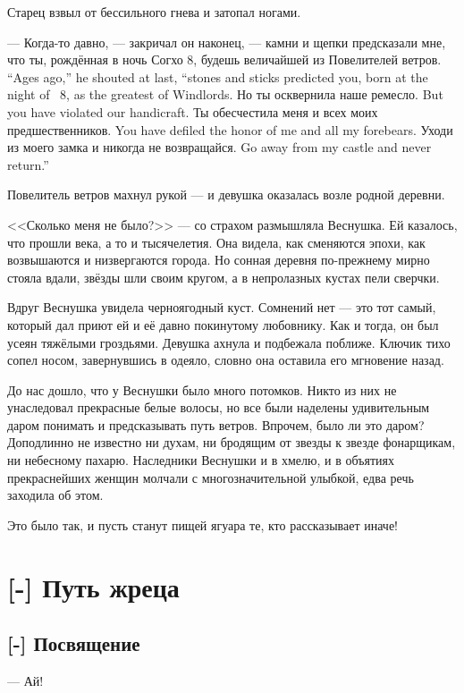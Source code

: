 Старец взвыл от бессильного гнева и затопал ногами.

{--- Когда-то давно, --- закричал он наконец, --- камни и щепки предсказали мне, что ты, рождённая в ночь Согхо 8, будешь величайшей из Повелителей ветров.}
{``Ages ago,'' he shouted at last, ``stones and sticks predicted you, born at the night of \Sogcho\ 8, as the greatest of Windlords.}
{Но ты осквернила наше ремесло.}
{But you have violated our handicraft.}
{Ты обесчестила меня и всех моих предшественников.}
{You have defiled the honor of me and all my forebears.}
{Уходи из моего замка и никогда не возвращайся.}
{Go away from my castle and never return.''}

Повелитель ветров махнул рукой --- и девушка оказалась возле родной деревни.

<<Сколько меня не было?>> --- со страхом размышляла Веснушка.
Ей казалось, что прошли века, а то и тысячелетия.
Она видела, как сменяются эпохи, как возвышаются и низвергаются города.
Но сонная деревня по-прежнему мирно стояла вдали, звёзды шли своим кругом, а в непролазных кустах пели сверчки.

Вдруг Веснушка увидела черноягодный куст.
Сомнений нет --- это тот самый, который дал приют ей и её давно покинутому любовнику.
Как и тогда, он был усеян тяжёлыми гроздьями.
Девушка ахнула и подбежала поближе.
Ключик тихо сопел носом, завернувшись в одеяло, словно она оставила его мгновение назад.

До нас дошло, что у Веснушки было много потомков.
Никто из них не унаследовал прекрасные белые волосы, но все были наделены удивительным даром понимать и предсказывать путь ветров.
Впрочем, было ли это даром?
Доподлинно не известно ни духам, ни бродящим от звезды к звезде фонарщикам, ни небесному пахарю.
Наследники Веснушки и в хмелю, и в объятиях прекраснейших женщин молчали с многозначительной улыбкой, едва речь заходила об этом.

Это было так, и пусть станут пищей ягуара те, кто рассказывает иначе!

\chapter{[-] Путь жреца}

\section{[-] Посвящение}

--- Ай!

